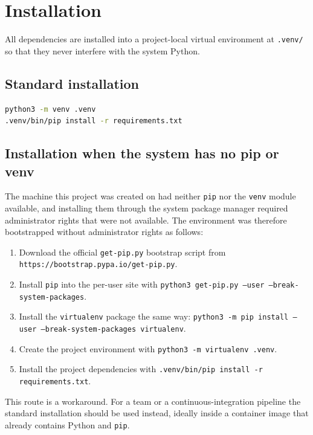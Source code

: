 \documentclass[a4paper,12pt]{article}
\newcommand{\code}[1]{\texttt{#1}}
\begin{document}
\section{Installation}
\label{sec:bootstrap}

All dependencies are installed into a project-local virtual environment at
\code{.venv/} so that they never interfere with the system Python.

\subsection{Standard installation}

\begin{lstlisting}[language=bash]
python3 -m venv .venv
.venv/bin/pip install -r requirements.txt
\end{lstlisting}

\subsection{Installation when the system has no pip or venv}

The machine this project was created on had neither \code{pip} nor the
\code{venv} module available, and installing them through the system package
manager required administrator rights that were not available. The environment
was therefore bootstrapped without administrator rights as follows:

\begin{enumerate}
  \item Download the official \code{get-pip.py} bootstrap script from
        \code{https://bootstrap.pypa.io/get-pip.py}.
  \item Install \code{pip} into the per-user site with
        \code{python3 get-pip.py --user --break-system-packages}.
  \item Install the \code{virtualenv} package the same way:
        \code{python3 -m pip install --user --break-system-packages virtualenv}.
  \item Create the project environment with
        \code{python3 -m virtualenv .venv}.
  \item Install the project dependencies with
        \code{.venv/bin/pip install -r requirements.txt}.
\end{enumerate}

This route is a workaround. For a team or a continuous-integration pipeline the
standard installation should be used instead, ideally inside a container image
that already contains Python and \code{pip}.
\end{document}
